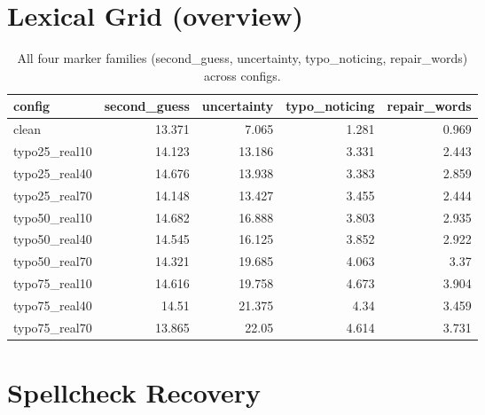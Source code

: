 \documentclass[11pt]{article}
\begin{document}
\section*{Lexical Grid (overview)}
\begin{table}[H]
\centering
\caption{All four marker families (second\_guess, uncertainty, typo\_noticing, repair\_words) across configs.}
\small
\begin{adjustbox}{max width=\textwidth}
\begin{tabular}{lrrrr}
\toprule
\textbf{config} & \textbf{second\_guess} & \textbf{uncertainty} & \textbf{typo\_noticing} & \textbf{repair\_words} \\
\midrule
clean & 13.371 & 7.065 & 1.281 & 0.969 \\
typo25\_real10 & 14.123 & 13.186 & 3.331 & 2.443 \\
typo25\_real40 & 14.676 & 13.938 & 3.383 & 2.859 \\
typo25\_real70 & 14.148 & 13.427 & 3.455 & 2.444 \\
typo50\_real10 & 14.682 & 16.888 & 3.803 & 2.935 \\
typo50\_real40 & 14.545 & 16.125 & 3.852 & 2.922 \\
typo50\_real70 & 14.321 & 19.685 & 4.063 & 3.37 \\
typo75\_real10 & 14.616 & 19.758 & 4.673 & 3.904 \\
typo75\_real40 & 14.51 & 21.375 & 4.34 & 3.459 \\
typo75\_real70 & 13.865 & 22.05 & 4.614 & 3.731 \\
\bottomrule
\end{tabular}
\end{adjustbox}
\end{table}

\section*{Spellcheck Recovery}

\end{document}
